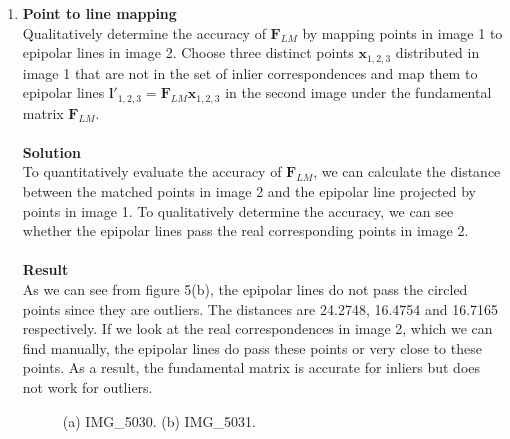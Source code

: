 \documentclass{../../assignment}
\begin{document}
\begin{problemlist}
\begin{enumerate}
\item \textbf{Point to line mapping}\\
Qualitatively determine the accuracy of $\mathbf{F}_{LM}$ by mapping points in image 1 to epipolar lines in image 2. Choose three distinct points $\mathbf{x}_{1,2,3}$ distributed in image 1 that are not in the set of inlier correspondences and map them to epipolar lines $\mathbf{l}' _{1,2,3} = \mathbf{F}_{LM}\mathbf{x}_{1,2,3}$ in the second image under the fundamental matrix $\mathbf{F}_{LM}$.
\\\\
\textbf{Solution}\\
To quantitatively evaluate the accuracy of $\mathbf{F}_{LM}$, we can calculate the distance between the matched points in image 2 and the epipolar line projected by points in image 1. To qualitatively determine the accuracy, we can see whether the epipolar lines pass the real corresponding points in image 2.
\\\\
\textbf{Result}\\
As we can see from figure 5(b), the epipolar lines do not pass the circled points since they are outliers. The distances are 24.2748, 16.4754 and 16.7165 respectively. If we look at the real correspondences in image 2, which we can find manually, the epipolar lines do pass these points or very close to these points. As a result, the fundamental matrix is accurate for inliers but does not work for outliers.
\begin{figure}[H]
\caption{(a) IMG\_5030. (b) IMG\_5031.}
\label{fig:images}
\end{figure}
\end{enumerate}
\end{problemlist}
\end{document}
